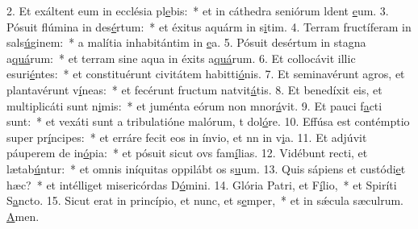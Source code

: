 2. Et exáltent eum in ecclésia pl\uline{e}bis:~* et in cáthedra seniórum ldent \uline{e}um.
3. Pósuit flúmina in des\uline{é}rtum:~* et éxitus aquárm in s\uline{i}tim.
4. Terram fructíferam in sals\uline{ú}ginem:~* a malítia inhabitántim in \uline{e}a.
5. Pósuit desértum in stagna a\uline{quá}rum:~* et terram sine aqua in éxits a\uline{quá}rum.
6. Et collocávit illic esuri\uline{é}ntes:~* et constituérunt civitátem habitti\uline{ó}nis.
7. Et seminavérunt agros, et plantavérunt v\uline{í}neas:~* et fecérunt fructum natvit\uline{á}tis.
8. Et benedíxit eis, et multiplicáti sunt n\uline{i}mis:~* et juménta eórum non mnor\uline{á}vit.
9. Et pauci f\uline{a}cti sunt:~* et vexáti sunt a tribulatióne malórum, t dol\uline{ó}re.
10. Effúsa est contémptio super pr\uline{í}ncipes:~* et erráre fecit eos in ínvio, et nn in v\uline{i}a.
11. Et adjúvit páuperem de in\uline{ó}pia:~* et pósuit sicut ovs fam\uline{í}lias.
12. Vidébunt recti, et lætab\uline{ú}ntur:~* et omnis iníquitas oppilábt os s\uline{u}um.
13. Quis sápiens et custódi\uline{e}t hæc?~* et intélliget misericórdas D\uline{ó}mini.
14. Glória Patri, et F\uline{í}lio,~* et Spiríti S\uline{a}ncto.
15. Sicut erat in princípio, et nunc, et s\uline{e}mper,~* et in sǽcula sæculrum. \uline{A}men.

